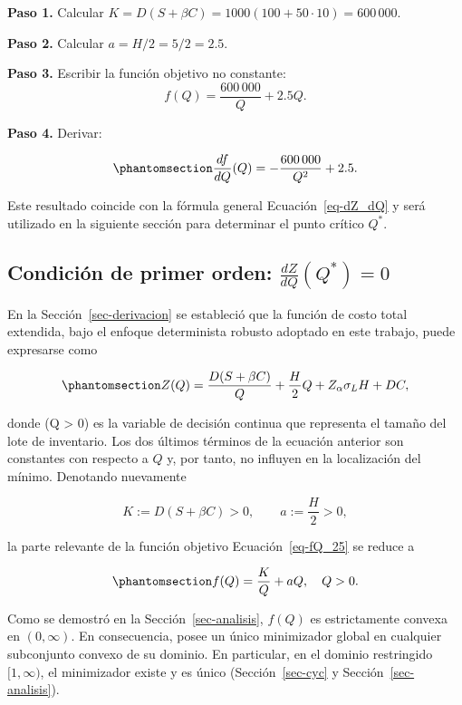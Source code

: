 \documentclass[
  spanish,
  us-letterpaper,
]{scrreprt}
\numberwithin{equation}{section}
\begin{document}
\textbf{Paso 1.} Calcular
\(K = D(S + \beta C) = 1000(100 + 50 \cdot 10) = 600\,000\).

\textbf{Paso 2.} Calcular \(a = H/2 = 5/2 = 2.5\).

\textbf{Paso 3.} Escribir la función objetivo no constante: \[
f(Q) = \frac{600\,000}{Q} + 2.5 Q.
\]

\textbf{Paso 4.} Derivar:

\begin{equation}\phantomsection\label{eq-df_dQ_ejemplo}{
\frac{df}{dQ}(Q) = -\frac{600\,000}{Q^2} + 2.5.
}\end{equation}

Este resultado coincide con la fórmula general Ecuación~\ref{eq-dZ_dQ} y
será utilizado en la siguiente sección para determinar el punto crítico
\(Q^*\).

\subsection{\texorpdfstring{Condición de primer orden:
\(\frac{dZ}{dQ}(Q^*) = 0\)}{Condición de primer orden: \textbackslash frac\{dZ\}\{dQ\}(Q\^{}*) = 0}}\label{condiciuxf3n-de-primer-orden-fracdzdqq-0}

En la Sección~\ref{sec-derivacion} se estableció que la función de costo
total extendida, bajo el enfoque determinista robusto adoptado en este
trabajo, puede expresarse como

\begin{equation}\phantomsection\label{eq-ZQ_total_26_2}{
Z(Q) = \frac{D(S + \beta C)}{Q} + \frac{H}{2} Q + Z_\alpha \sigma_L H + D C,
}\end{equation}

donde (Q \textgreater{} 0) es la variable de decisión continua que
representa el tamaño del lote de inventario. Los dos últimos términos de
la ecuación anterior son constantes con respecto a \(Q\) y, por tanto,
no influyen en la localización del mínimo. Denotando nuevamente

\[
K := D(S + \beta C) > 0, \qquad a := \frac{H}{2} > 0,
\]

la parte relevante de la función objetivo Ecuación~\ref{eq-fQ_25} se
reduce a

\begin{equation}\phantomsection\label{eq-fQ_26_2}{
f(Q) = \frac{K}{Q} + a Q, \quad Q > 0.
}\end{equation}

Como se demostró en la Sección~\ref{sec-analisis}, \(f(Q)\) es
estrictamente convexa en \((0, \infty)\). En consecuencia, posee un
único minimizador global en cualquier subconjunto convexo de su dominio.
En particular, en el dominio restringido \([1, \infty)\), el minimizador
existe y es único (Sección~\ref{sec-cyc} y Sección~\ref{sec-analisis}).
\end{document}
